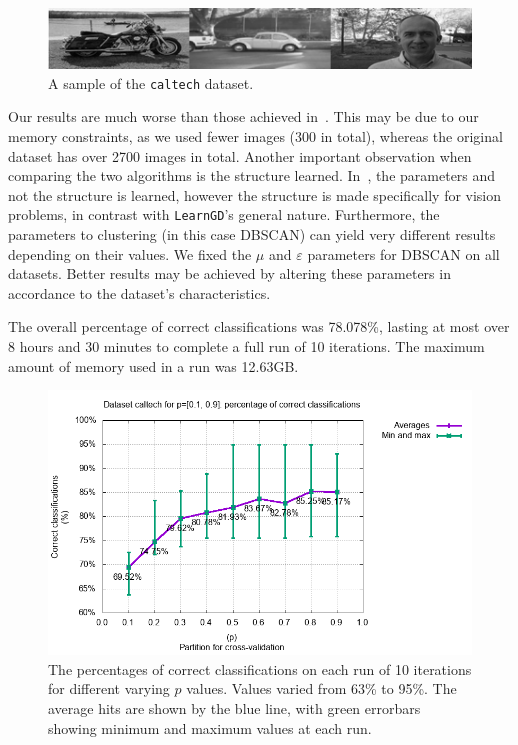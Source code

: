 \documentclass{amsart}
\theoremstyle{plain}
\numberwithin{equation}{section}
\newcommand{\eps}{\varepsilon}
\newcommand{\code}[1]{\lstinline[mathescape=true]{#1}}
\begin{document}
\begin{figure}[h]
  \centering\includegraphics[scale=0.8]{imgs/caltech_sample.png}
  \caption{A sample of the \code{caltech} dataset.}
\end{figure}

Our results are much worse than those achieved in~\cite{poon-domingos}. This may be due to our
memory constraints, as we used fewer images (300 in total), whereas the original dataset has over
2700 images in total. Another important observation when comparing the two algorithms is the
structure learned. In~\cite{poon-domingos}, the parameters and not the structure is learned,
however the structure is made specifically for vision problems, in contrast with \code{LearnGD}'s
general nature. Furthermore, the parameters to clustering (in this case DBSCAN) can yield very
different results depending on their values. We fixed the $\mu$ and $\eps$ parameters for DBSCAN on
all datasets. Better results may be achieved by altering these parameters in accordance to the
dataset's characteristics.

The overall percentage of correct classifications was 78.078\%, lasting at most over 8 hours and 30
minutes to complete a full run of 10 iterations. The maximum amount of memory used in a run was
12.63GB\@.

\begin{figure}[p]
  \centering\includegraphics[scale=0.6]{imgs/caltech_percs.png}
  \captionsetup{singlelinecheck=false,justification=justified,margin=0cm}
  \caption{The percentages of correct classifications on each run of 10 iterations for different
  varying $p$ values. Values varied from 63\% to 95\%. The average hits are shown by the blue line,
  with green errorbars showing minimum and maximum values at each run.}\label{fig:caltech-percs}
\end{figure}
\end{document}
